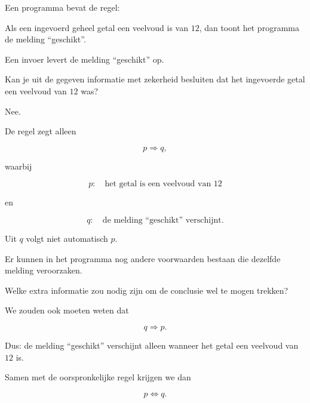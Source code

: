 \documentclass{ximera}
\begin{document}
\begin{oefening}{\oefU}

Een programma bevat de regel:

\begin{center}
Als een ingevoerd geheel getal een veelvoud is van $12$,
dan toont het programma de melding ``geschikt''.
\end{center}

Een invoer levert de melding ``geschikt'' op.

\begin{question}

Kan je uit de gegeven informatie met zekerheid besluiten dat het
ingevoerde getal een veelvoud van $12$ was?

\begin{oplossing}

Nee.

De regel zegt alleen

\[
p\Rightarrow q,
\]

waarbij

\[
p:\quad \text{het getal is een veelvoud van }12
\]

en

\[
q:\quad \text{de melding ``geschikt'' verschijnt}.
\]

Uit $q$ volgt niet automatisch $p$.

Er kunnen in het programma nog andere voorwaarden bestaan die dezelfde
melding veroorzaken.

\end{oplossing}

\end{question}


\begin{question}

Welke extra informatie zou nodig zijn om de conclusie wel te mogen
trekken?

\begin{oplossing}

We zouden ook moeten weten dat

\[
q\Rightarrow p.
\]

Dus: de melding ``geschikt'' verschijnt alleen wanneer het getal een
veelvoud van $12$ is.

Samen met de oorspronkelijke regel krijgen we dan

\[
p\Leftrightarrow q.
\]

\end{oplossing}

\end{question}

\end{oefening}
\end{document}
